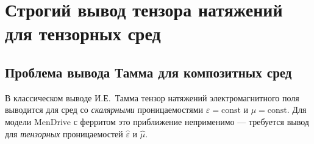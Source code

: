 \documentclass[a4paper,12pt]{article}
\begin{document}






\section{Строгий вывод тензора натяжений для тензорных сред}

\subsection{Проблема вывода Тамма для композитных сред}

В классическом выводе И.Е.~Тамма \cite{Tamm} тензор натяжений электромагнитного поля выводится для сред со \textit{скалярными} проницаемостями $\varepsilon = \text{const}$ и $\mu = \text{const}$. Для модели MenDrive с ферритом это приближение неприменимо --- требуется вывод для \textit{тензорных} проницаемостей $\hat{\varepsilon}$ и $\hat{\mu}$.
\end{document}
